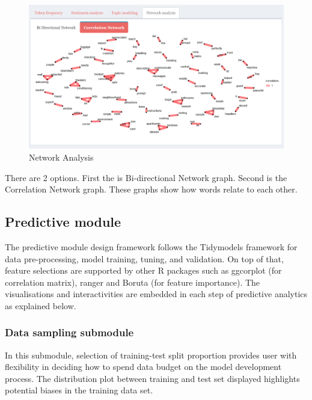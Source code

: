 \documentclass{acm_proc_article-sp}
\begin{document}
\begin{figure}[H]

{\centering \includegraphics[width=1\linewidth]{images/correlationnetwork} 

}

\caption{Network Analysis}\label{fig:unnamed-chunk-8}
\end{figure}

There are 2 options. First the is Bi-directional Network graph. Second
is the Correlation Network graph. These graphs show how words relate to
each other.

\hypertarget{predictive-module}{%
\subsection{Predictive module}\label{predictive-module}}

The predictive module design framework follows the Tidymodels framework
for data pre-processing, model training, tuning, and validation. On top
of that, feature selections are supported by other R packages such as
ggcorplot (for correlation matrix), ranger and Boruta (for feature
importance). The visualisations and interactivities are embedded in each
step of predictive analytics as explained below.

\hypertarget{data-sampling-submodule}{%
\subsubsection{Data sampling submodule}\label{data-sampling-submodule}}

In this submodule, selection of training-test split proportion provides
user with flexibility in deciding how to spend data budget on the model
development process. The distribution plot between training and test set
displayed highlights potential biases in the training data set.
\end{document}

